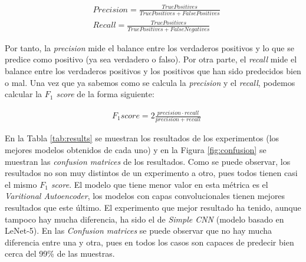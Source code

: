 \begin{align}
	&Precision = \frac{True Positives}{True Positives + False Positives}\\
	&Recall = \frac{True Positives}{True Positives + False Negatives}
\end{align}

Por tanto, la \textit{precision} mide el balance entre los verdaderos positivos y lo que se predice como positivo (ya sea verdadero o falso). Por otra parte, el \textit{recall} mide el balance entre los verdaderos positivos y los positivos que han sido predecidos bien o mal. Una vez que ya sabemos como se calcula la \textit{precision} y el \textit{recall}, podemos calcular la \textit{$F_1$ score} de la forma siguiente:

\begin{align}
&F_1 score = 2 \frac{precision \cdot recall}{precision + recall}
\end{align}

En la Tabla \ref{tab:results} se muestran los resultados de los experimentos (los mejores modelos obtenidos de cada uno) y en la Figura \ref{fig:confusion} se muestran las \textit{confusion matrices} de los resultados. Como se puede observar, los resultados no son muy distintos de un experimento a otro, pues todos tienen casi el mismo \textit{$F_1$ score}. El modelo que tiene menor valor en esta métrica es el \textit{Varitional Autoencoder}, los modelos con capas convolucionales tienen mejores resultados que este último. El experimento que mejor resultado ha tenido, aunque tampoco hay mucha diferencia, ha sido el de \textit{Simple CNN} (modelo basado en LeNet-5). En las \textit{Confusion matrices} se puede observar que no hay mucha diferencia entre una y otra, pues en todos los casos son capaces de predecir bien cerca del 99\% de las muestras.\\


